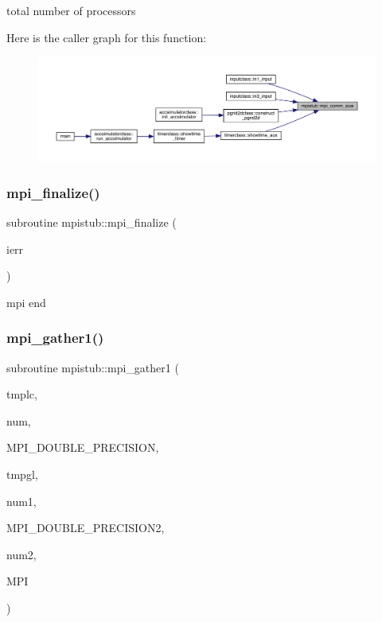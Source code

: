 total number of processors 

Here is the caller graph for this function\+:\nopagebreak
\begin{figure}[H]
\begin{center}
\leavevmode
\includegraphics[width=350pt]{namespacempistub_a188b67a76569dcb918a27f48018e6baf_icgraph}
\end{center}
\end{figure}
\mbox{\label{namespacempistub_a6a6bc8ca0a832b3f53660407ed51302d}} 
\subsubsection{\texorpdfstring{mpi\_finalize()}{mpi\_finalize()}}
{\footnotesize\ttfamily subroutine mpistub\+::mpi\+\_\+finalize (\begin{DoxyParamCaption}\item[{}]{ierr }\end{DoxyParamCaption})}



mpi end 

\mbox{\label{namespacempistub_a3e61dfb24d3caebd2c2983a9e4ab3dfd}} 
\subsubsection{\texorpdfstring{mpi\_gather1()}{mpi\_gather1()}}
{\footnotesize\ttfamily subroutine mpistub\+::mpi\+\_\+gather1 (\begin{DoxyParamCaption}\item[{double precision, dimension(\+:)}]{tmplc,  }\item[{}]{num,  }\item[{}]{M\+P\+I\+\_\+\+D\+O\+U\+B\+L\+E\+\_\+\+P\+R\+E\+C\+I\+S\+I\+ON,  }\item[{double precision, dimension(\+:)}]{tmpgl,  }\item[{}]{num1,  }\item[{}]{M\+P\+I\+\_\+\+D\+O\+U\+B\+L\+E\+\_\+\+P\+R\+E\+C\+I\+S\+I\+O\+N2,  }\item[{}]{num2,  }\item[{}]{M\+PI }\end{DoxyParamCaption})}




